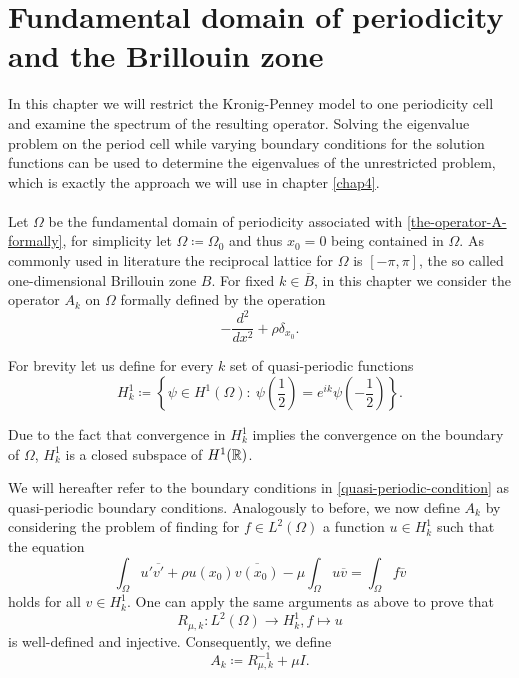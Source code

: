 \chapter{Fundamental domain of periodicity and the Brillouin zone}  \label{chap3}

In this chapter we will restrict the Kronig-Penney model to one periodicity cell and examine the spectrum of the resulting operator. Solving the eigenvalue problem on the period cell while varying boundary conditions for the solution functions can be used to determine the eigenvalues of the unrestricted problem, which is exactly the approach we will use in chapter \ref{chap4}.
~\\ ~\\
Let $\Omega$ be the fundamental domain of periodicity associated with \eqref{the-operator-A-formally}, for simplicity let $\Omega \coloneqq \Omega_{0}$ and thus $x_{0} = 0$ being contained in $\Omega$. As commonly used in literature the reciprocal lattice for $\Omega$ is $[-\pi, \pi]$, the so called one-dimensional Brillouin zone $B$. For fixed $k \in \overline{B}$, in this chapter we consider the operator $A_{k}$ on $\Omega$ formally defined by the operation 
	\[ -\frac{d^{2}}{dx^{2}} + \rho \delta_{x_{0}}. \]
\begin{definition} 
	For brevity let us define for every $k$ set of quasi-periodic functions  
	\begin{equation}
		H^{1}_{k} \coloneqq \left\{ \psi \in H^{1}(\Omega): ~ \psi\left(\frac{1}{2}\right) = e^{ik} \psi\left(-\frac{1}{2}\right) \right\}. \label{quasi-periodic-condition}
	\end{equation}
\end{definition}	
\begin{remark}
Due to the fact that convergence in $H^{1}_{k}$ implies the convergence on the boundary of $\Omega$, $H^{1}_{k}$ is a closed subspace of $H^{1}(\mathbb{R})$.
\end{remark}
We will hereafter refer to the boundary conditions in \eqref{quasi-periodic-condition} as quasi-periodic boundary conditions. Analogously to before, we now define $A_{k}$ by considering the problem of finding for $f \in L^{2}(\Omega)$ a function $u \in H^{1}_{k}$ such that the equation
	\[ \int_{\Omega} u' \overline{v'} + \rho u(x_{0}) \overline{v(x_{0})} - \mu \int_{\Omega} u \overline{v} = \int_{\Omega} f \overline{v} \]
holds for all $v \in H^{1}_{k}$. One can apply the same arguments as above to prove that 
	\[ R_{\mu, k} \colon L^{2}(\Omega) \rightarrow H^{1}_{k}, f \mapsto u \]
is well-defined and injective. Consequently, we define
	\[ A_{k} \coloneqq R_{\mu, k}^{-1} + \mu I. \] 

